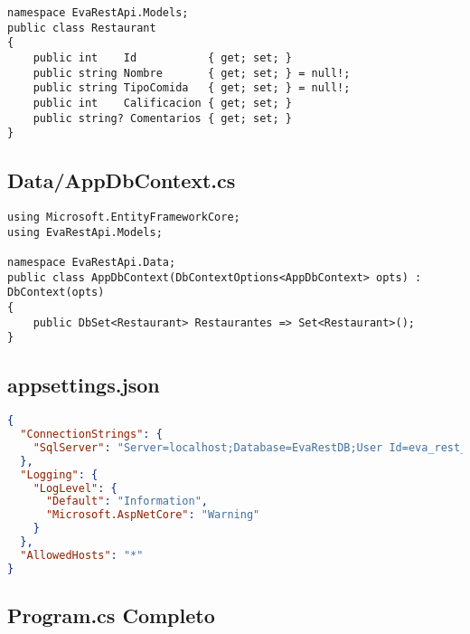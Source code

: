 \documentclass[12pt,a4paper]{report}
\begin{document}
\begin{lstlisting}[language={[Sharp]C}]
namespace EvaRestApi.Models;
public class Restaurant
{
    public int    Id           { get; set; }
    public string Nombre       { get; set; } = null!;
    public string TipoComida   { get; set; } = null!;
    public int    Calificacion { get; set; }
    public string? Comentarios { get; set; }
}
\end{lstlisting}

\subsection{Data/AppDbContext.cs}

\begin{lstlisting}[language={[Sharp]C}]
using Microsoft.EntityFrameworkCore;
using EvaRestApi.Models;

namespace EvaRestApi.Data;
public class AppDbContext(DbContextOptions<AppDbContext> opts) : DbContext(opts)
{
    public DbSet<Restaurant> Restaurantes => Set<Restaurant>();
}
\end{lstlisting}

\subsection{appsettings.json}

\begin{lstlisting}[language=json]
{
  "ConnectionStrings": {
    "SqlServer": "Server=localhost;Database=EvaRestDB;User Id=eva_rest_user;Password=P@ssw0rd2025!;TrustServerCertificate=True;"
  },
  "Logging": {
    "LogLevel": {
      "Default": "Information",
      "Microsoft.AspNetCore": "Warning"
    }
  },
  "AllowedHosts": "*"
}
\end{lstlisting}

\subsection{Program.cs Completo}
\end{document}

